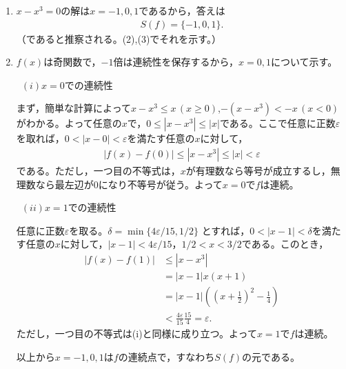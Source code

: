 \documentclass[a4paper,12pt,dvipdfmx,fleqn, oneside]{jsarticle}
\theoremstyle{defstyle}
\theoremstyle{thmx}
\theoremstyle{qesstyle}
\begin{document}
\begin{screen}
    \begin{enumerate}
        \item $x-x^3=0$の解は$x=-1,0,1$であるから，答えは
              \begin{align*}
                  S(f)=\{-1,0,1\}.
              \end{align*}
              （であると推察される。(2),(3)でそれを示す。）
        \item $f(x)$は奇関数で，$-1$倍は連続性を保存するから，$x=0,1$について示す。

              \, $(i)$$x=0$での連続性

                          \text{　}まず，簡単な計算によって$x-x^3 \leq x \, (x \geq 0)$,$-(x-x^3) < -x \, (x < 0)$がわかる。よって任意の$x$で，$0 \leq |x-x^3|\leq |x|$である。ここで任意に正数$\varepsilon$を取れば，$0<|x-0|<\varepsilon$を満たす任意の$x$に対して，
                          \begin{align*}
                              |f(x)-f(0)| \leq |x-x^3| \leq |x| < \varepsilon
                          \end{align*}
                          である。ただし，一つ目の不等式は，$x$が有理数なら等号が成立するし，無理数なら最左辺が$0$になり不等号が従う。よって$x=0$で$f$は連続。

                          \, $(ii)$$x=1$での連続性

                      \text{　}任意に正数$\varepsilon$を取る。$\delta = \min \{ 4\varepsilon/15 , 1/2 \}$ とすれば，$0<|x-1|< \delta$を満たす任意の$x$に対して，$|x-1| < 4\varepsilon /15$，$1/2 <x<3/2$である。このとき，
                      \begin{align*}
                          |f(x)-f(1)| & \leq |x-x^3| \\&= |x-1|x(x+1) \\&= |x-1|\left(\left(x+\frac{1}{2}\right)^2-\frac{1}{4}\right) \\& < \frac{4\varepsilon}{15} \frac{15}{4} = \varepsilon.
                      \end{align*}
                      ただし，一つ目の不等式は(i)と同様に成り立つ。よって$x=1$で$f$は連続。

                      \text{　}以上から$x=-1,0,1$は$f$の連続点で，すなわち$S(f)$の元である。
    \end{enumerate}
\end{screen}
\end{document}
